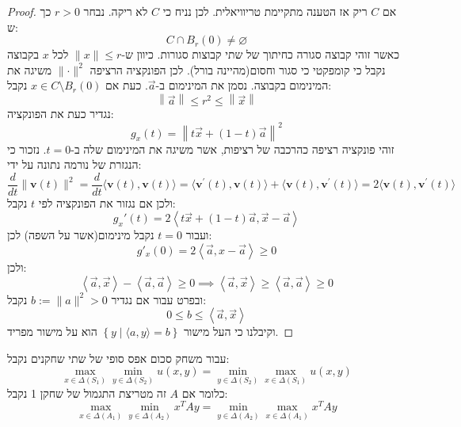 \documentclass{tstextbook}
\begin{document}
\begin{proof}
אם \(C\) ריק אז הטענה מתקיימת טריוויאלית. לכן נניח כי \(C\) לא ריקה. נבחר \(r> 0\) כך ש:
$$C\cap B_{r}(0)\neq \varnothing $$
כאשר זוהי קבוצה סגורה כחיתוך של שתי קבוצות סגורות. כיוון ש-\(\lVert x \rVert\leq r\) לכל \(x\) בקבוצה נקבל כי קומפקטי כי סגור וחסום(מהיינה בורל). לכן הפונקציה הרציפה \(\lVert \cdot \rVert^{2}\) משיגה את המינימום בקבוצה. נסמן את המינימום ב-\(\vec{a}\).
כעת אם \(x \in C\setminus B_{r}(0)\) נקבל:
$$\left\lVert  \vec{a}  \right\rVert \leq r^{2}\leq\left\lVert  \vec{x}  \right\rVert $$
נגדיר כעת את הפונקציה:
$$g_{x}(t)=\left\lVert  t\vec{x}+(1-t)\vec{a}  \right\rVert ^{2}$$
זוהי פונקציה רציפה כהרכבה של רציפות, אשר משיגה את המינימום שלה ב-\(t=0\). נזכור כי הנגזרת של נורמה נתונה על ידי:
$${\frac{d}{d t}}\|\mathbf{v}(t)\|^{2}={\frac{d}{d t}}\langle\mathbf{v}(t),\mathbf{v}(t)\rangle=\langle\mathbf{v}^{\prime}(t),\mathbf{v}(t)\rangle+\langle\mathbf{v}(t),\mathbf{v}^{\prime}(t)\rangle=2\langle\mathbf{v}(t),\mathbf{v}^{\prime}(t)\rangle$$
ולכן אם נגזור את הפונקציה לפי \(t\) נקבל:
$$g_{x}'(t)=2\left\langle  t\vec{x}+(1-t)\vec{a},\vec{x}-\vec{a}  \right\rangle$$
ועבור \(t=0\) נקבל מינימום(אשר על השפה) לכן:
$$g'_{x}(0)=2\left\langle  \vec{a},x-\vec{a}  \right\rangle \geq 0$$
ולכן:
$$\left\langle  \vec{a},\vec{x}  \right\rangle -\left\langle  \vec{a},\vec{a}  \right\rangle \geq 0\implies \left\langle  \vec{a},\vec{x}  \right\rangle \geq \left\langle  \vec{a},\vec{a}  \right\rangle \geq 0$$
ובפרט עבור אם נגדיר \(b:=\|a\|^{2}>0\) נקבל:
$$0\leq b\leq \left\langle  \vec{a},\vec{x}  \right\rangle $$
וקיבלנו כי העל מישור \(\left\{  y\mid \langle a,y \rangle=b  \right\}\) הוא על מישור מפריד.

\end{proof}
\begin{theorem}[מינימקס]
עבור משחק סכום אפס סופי של שתי שחקנים נקבל:
$$\operatorname*{max}_{x\in\Delta(S_{1})}\operatorname*{min}_{y\in\Delta(S_{2})}u(x,y)=\operatorname*{min}_{y\in\Delta(S_{2})}\operatorname*{max}_{x\in\Delta(S_{1})}u(x,y)$$
כלומר אם \(A\) זה מטריצת התגמול של שחקן 1 נקבל:
$$\operatorname*{max}_{x\in\Delta(A_{1})}\operatorname*{min}_{y\in\Delta(A_{2})}x^{T}A y=\operatorname*{min}_{y\in\Delta(A_{2})}\operatorname*{max}_{x\in\Delta(A_{1})}x^{T}A y$$

\end{theorem}
\end{document}
